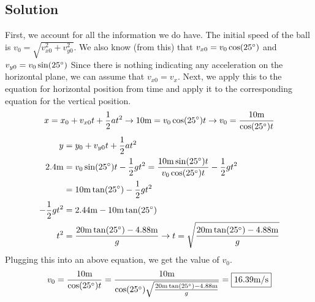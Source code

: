 \documentclass[12pt]{article}
\begin{document}
\subsection*{Solution}
First, we account for all the information we do have. The initial speed of the ball is $v_0 = \sqrt{v_{x0}^2 + v_{y0}^2}$. We also know (from this) that $v_{x0} = v_0\cos(25\degree)$ and $v_{y0} = v_0\sin(25\degree)$ Since there is nothing indicating any acceleration on the horizontal plane, we can assume that $v_{x0} = v_{x}$. Next, we apply this to the equation for horizontal position from time and apply it to the corresponding equation for the vertical position.
\begin{equation*}
    x = x_0 + v_{x0} t + \frac{1}{2}at^2 \rightarrow 
    10\unit{\meter} = v_0\cos(25\degree)t \rightarrow
    v_0 = \frac{10\unit{\meter}}{\cos(25\degree)t}
\end{equation*}
\begin{align*}
    y &= y_0 + v_{y0} t + \frac{1}{2}at^2\\
    2.4\unit{\meter} &= v_0\sin(25\degree)t - \frac{1}{2}gt^2 
        = \frac{10\unit{\meter}\sin(25\degree)t}{v_0\cos(25\degree)t} - \frac{1}{2}gt^2\\
        &= 10\unit{\meter}\tan(25\degree) - \frac{1}{2}gt^2\\
    -\frac{1}{2}gt^2 &= 2.44\unit{\meter} - 10\unit{\meter} \tan(25\degree)\\
    t^2 &= \frac{20\unit{\meter}\tan(25\degree) - 4.88\unit{\meter}}{g} \rightarrow 
    t = \sqrt{\frac{20\unit{\meter}\tan(25\degree) - 4.88\unit{\meter}}{g}}
\end{align*}
Plugging this into an above equation, we get the value of $v_0$.
\begin{equation*}
    v_0 = \frac{10\unit{\meter}}{\cos(25\degree)t} = \frac{10\unit{\meter}}{\cos(25\degree)\sqrt{\frac{20\unit{\meter}\tan(25\degree) - 4.88\unit{\meter}}{g}}} = \boxed{16.39\unit{\meter/\second}}
\end{equation*}
\end{document}
